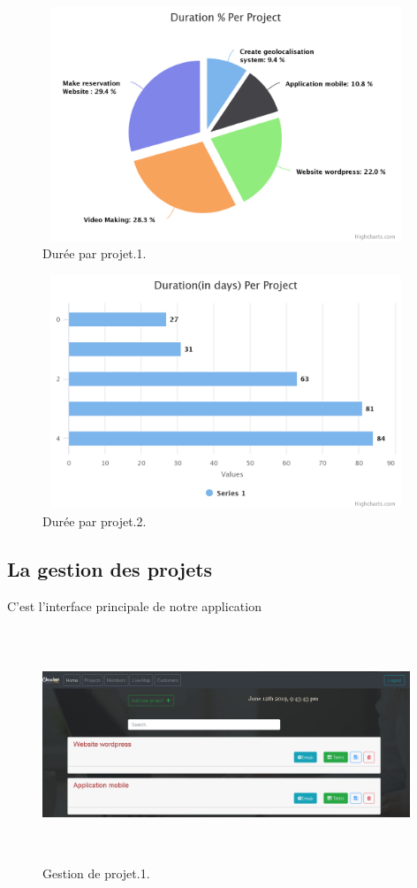 \FloatBarrier
\begin{figure}[H]
\center
\includegraphics[width=11cm,height=7cm]{./figures/pres/duration-per-project.png}
\caption{Dur\'{e}e par projet.1. }
\end{figure}
\FloatBarrier

\FloatBarrier
\begin{figure}[H]
\center
\includegraphics[width=11cm,height=7cm]{./figures/pres/durationin-days-per-proj.png}
\caption{Dur\'{e}e par projet.2.}
\end{figure}
\FloatBarrier



\newpage

\subsection{La gestion des projets}


C’est l’interface principale de notre application
\FloatBarrier
\begin{figure}[H]
\center
\includegraphics[width=11cm,height=7cm]{./figures/pres/gp1.png}
\caption{Gestion de projet.1.}
\end{figure}
\FloatBarrier



